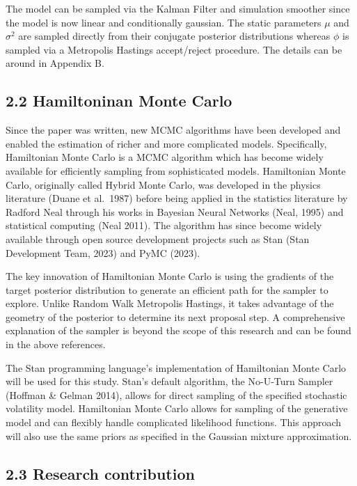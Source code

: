 \documentclass[
  12pt,
  letterpaper,
  DIV=11,
  numbers=noendperiod]{scrartcl}
\begin{document}
The model can be sampled via the Kalman Filter and simulation smoother
since the model is now linear and conditionally gaussian. The static
parameters \(\mu\) and \(\sigma^2\) are sampled directly from their
conjugate posterior distributions whereas \(\phi\) is sampled via a
Metropolis Hastings accept/reject procedure. The details can be around
in Appendix B.

\hypertarget{hamiltoninan-monte-carlo}{%
\subsection{2.2 Hamiltoninan Monte
Carlo}\label{hamiltoninan-monte-carlo}}

Since the paper was written, new MCMC algorithms have been developed and
enabled the estimation of richer and more complicated models.
Specifically, Hamiltonian Monte Carlo is a MCMC algorithm which has
become widely available for efficiently sampling from sophisticated
models. Hamiltonian Monte Carlo, originally called Hybrid Monte Carlo,
was developed in the physics literature (Duane et al.~1987) before being
applied in the statistics literature by Radford Neal through his works
in Bayesian Neural Networks (Neal, 1995) and statistical computing (Neal
2011). The algorithm has since become widely available through open
source development projects such as Stan (Stan Development Team, 2023)
and PyMC (2023).

The key innovation of Hamiltonian Monte Carlo is using the gradients of
the target posterior distribution to generate an efficient path for the
sampler to explore. Unlike Random Walk Metropolis Hastings, it takes
advantage of the geometry of the posterior to determine its next
proposal step. A comprehensive explanation of the sampler is beyond the
scope of this research and can be found in the above references.

The Stan programming language's implementation of Hamiltonian Monte
Carlo will be used for this study. Stan's default algorithm, the
No-U-Turn Sampler (Hoffman \& Gelman 2014), allows for direct sampling
of the specified stochastic volatility model. Hamiltonian Monte Carlo
allows for sampling of the generative model and can flexibly handle
complicated likelihood functions. This approach will also use the same
priors as specified in the Gaussian mixture approximation.

\hypertarget{research-contribution}{%
\subsection{2.3 Research contribution}\label{research-contribution}}
\end{document}
